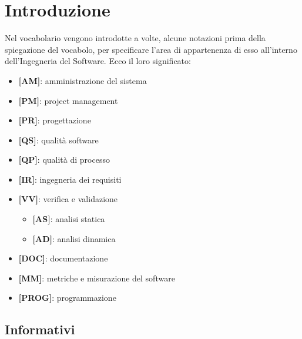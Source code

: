 %
%
%

\section{Introduzione} %
\label{sec:introduzione}
Nel vocabolario vengono introdotte a volte, alcune notazioni prima della spiegazione del vocabolo, per specificare l'area di appartenenza di esso all'interno dell'Ingegneria del Software. Ecco il loro significato:
	\begin{itemize}
		\item \textbf{[AM]}: amministrazione del sistema
		\item \textbf{[PM]}: project management
		\item \textbf{[PR]}: progettazione
		\item \textbf{[QS]}: qualità software
		\item \textbf{[QP]}: qualità di processo
		\item \textbf{[IR]}: ingegneria dei requisiti
		\item \textbf{[VV]}: verifica e validazione
			\begin{itemize}
				\item \textbf{[AS]}: analisi statica
				\item \textbf{[AD]}: analisi dinamica
			\end{itemize}
		\item \textbf{[DOC]}: documentazione
		\item \textbf{[MM]}: metriche e misurazione del software
		\item \textbf{[PROG]}: programmazione
	\end{itemize}

	\subsection{Informativi} %
	\label{sub:informativi}
